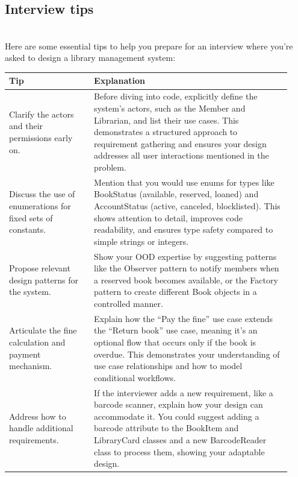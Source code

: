 \subsection{Interview tips}\label{jp-nOWVWqQflG_7NLI1Gn}
\\
Here are some essential tips to help you prepare for an interview where you're asked to design a library management system:

\begin{center}
\begin{tabular}{|p{0.28\linewidth}|p{0.65\linewidth}|}
\hline
\textbf{Tip} & \textbf{Explanation} \\
\hline
Clarify the actors and their permissions early on. & Before diving into code, explicitly define the system’s actors, such as the Member and Librarian, and list their use cases. This demonstrates a structured approach to requirement gathering and ensures your design addresses all user interactions mentioned in the problem. \\
\hline
Discuss the use of enumerations for fixed sets of constants. & Mention that you would use enums for types like BookStatus (available, reserved, loaned) and AccountStatus (active, canceled, blocklisted). This shows attention to detail, improves code readability, and ensures type safety compared to simple strings or integers. \\
\hline
Propose relevant design patterns for the system. & Show your OOD expertise by suggesting patterns like the Observer pattern to notify members when a reserved book becomes available, or the Factory pattern to create different Book objects in a controlled manner. \\
\hline
Articulate the fine calculation and payment mechanism. & Explain how the “Pay the fine” use case extends the “Return book” use case, meaning it’s an optional flow that occurs only if the book is overdue. This demonstrates your understanding of use case relationships and how to model conditional workflows. \\
\hline
Address how to handle additional requirements. & If the interviewer adds a new requirement, like a barcode scanner, explain how your design can accommodate it. You could suggest adding a barcode attribute to the BookItem and LibraryCard classes and a new BarcodeReader class to process them, showing your adaptable design. \\
\hline
\end{tabular}
\end{center}


